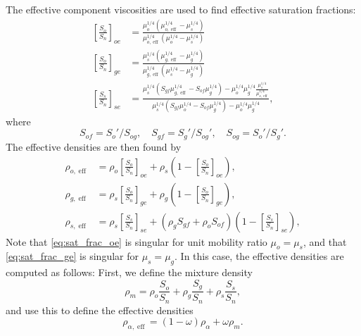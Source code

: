 \documentclass[11pt, a4paper]{article}
\DeclareMathOperator{\eff}{eff}
\begin{document}
The effective component viscosities are used to find effective saturation fractions:
\begin{subequations}
  \begin{align}
    \label{eq:sat_frac_oe}
    \left[\frac{S_o}{S_n}\right]_{oe} &= \frac{\mu_o^{1/4}\left(\mu_{o,\eff}^{1/4} - \mu_s^{1/4}\right)}{\mu_{o,\eff}^{1/4}\left(\mu_o^{1/4} - \mu_s^{1/4}\right)} \\
    \label{eq:sat_frac_ge}
  \left[\frac{S_o}{S_n}\right]_{ge} &= \frac{\mu_s^{1/4}\left(\mu_{g,\eff}^{1/4} - \mu_g^{1/4}\right)}{\mu_{g,\eff}^{1/4}\left(\mu_s^{1/4} - \mu_g^{1/4}\right)} \\
  \left[\frac{S_s}{S_n}\right]_{se} &= \frac{\mu_s^{1/4}\left(S_{gf}\mu_{g,\eff}^{1/4} - S_{of}\mu_g^{1/4}\right)
                                      - \mu_o^{1/4}\mu_g^{1/4}\frac{\mu_s^{1/4}}{\mu_{s,\eff}^{1/4}}}{\mu_s^{1/4}\left(S_{gf}\mu_o^{1/4} - S_{of}\mu_g^{1/4}\right) - \mu_o^{1/4}\mu_g^{1/4}},
\end{align}
\end{subequations}
where
\begin{equation*}
  S_{of} = S_o'/S_{og}, \quad S_{gf} = S_g'/S_{og}', \quad S_{og} = S_o'/S_g'.
\end{equation*}
The effective densities are then found by
\begin{align*}
  \rho_{o,\eff} & = \rho_o\left[\frac{S_o}{S_n}\right]_{oe} + \rho_s\left(1 - \left[\frac{S_o}{S_n}\right]_{oe}\right), \\
  \rho_{g,\eff} & = \rho_s\left[\frac{S_o}{S_n}\right]_{ge} + \rho_g\left(1 - \left[\frac{S_o}{S_n}\right]_{ge}\right), \\
  \rho_{s,\eff} & = \rho_s\left[\frac{S_s}{S_n}\right]_{se} + (\rho_gS_{gf} + \rho_oS_{of})\left(1 - \left[\frac{S_s}{S_n}\right]_{se}\right),
\end{align*}
Note that \eqref{eq:sat_frac_oe} is singular for unit mobility ratio $\mu_o = \mu_s$, and that
\eqref{eq:sat_frac_ge} is singular for $\mu_s = \mu_g$. In this case, the effective densities are
computed as follows: First, we define the mixture density
\begin{equation*}
  \rho_m = \rho_o \frac{S_o}{S_n} + \rho_g \frac{S_g}{S_n} + \rho_s \frac{S_s}{S_n},
\end{equation*}
and use this to define the effective densities
\begin{equation*}
  \rho_{\alpha,\eff} = (1-\omega) \rho_\alpha + \omega \rho_m.
\end{equation*}
\end{document}
